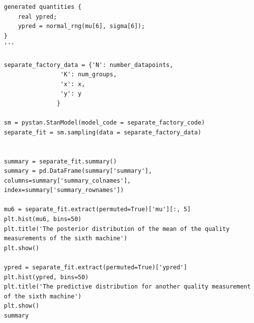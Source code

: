 \documentclass[17pt]{article}
\begin{document}
\begin{lstlisting}
generated quantities {
    real ypred;
    ypred = normal_rng(mu[6], sigma[6]);
}
'''

separate_factory_data = {'N': number_datapoints,
                'K': num_groups,
                'x': x,
                'y': y
               }

sm = pystan.StanModel(model_code = separate_factory_code)
separate_fit = sm.sampling(data = separate_factory_data)


summary = separate_fit.summary()
summary = pd.DataFrame(summary['summary'], columns=summary['summary_colnames'], index=summary['summary_rownames'])

mu6 = separate_fit.extract(permuted=True)['mu'][:, 5]
plt.hist(mu6, bins=50)
plt.title('The posterior distribution of the mean of the quality measurements of the sixth machine')
plt.show()

ypred = separate_fit.extract(permuted=True)['ypred']
plt.hist(ypred, bins=50)
plt.title('The predictive distribution for another quality measurement of the sixth machine')
plt.show()
summary
\end{lstlisting}
\end{document}
